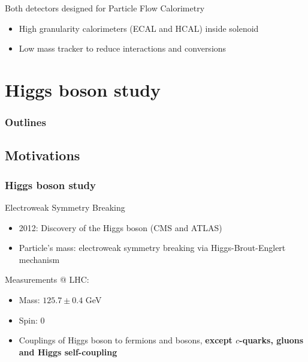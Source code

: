 \documentclass{beamer}
\begin{document}
\begin{frame}
  \vspace{-0.2cm}
  \begin{block}{Both detectors designed for Particle Flow Calorimetry}
    \footnotesize{
    \begin{itemize}
      \item High granularity calorimeters (ECAL and HCAL) inside solenoid
        \vspace{-0.1cm}
      \item Low mass tracker to reduce interactions and conversions
    \end{itemize}
    }
  \end{block}
  
\end{frame}
  
\section{Higgs boson study}
  \begin{frame}
    \frametitle{Outlines}
    \tableofcontents[currentsection,hideothersubsections, 
    sectionstyle=show/shaded,]
  \end{frame}

  \subsection{Motivations}

    \begin{frame}
      \frametitle{Higgs boson study}

      \begin{block}{Electroweak Symmetry Breaking}
        \begin{itemize}
          \item 2012: Discovery of the Higgs boson (CMS and ATLAS)
        \end{itemize}

      \end{block}

      \begin{itemize}
        \item Particle's mass: electroweak symmetry breaking via Higgs-Brout-Englert mechanism
      \end{itemize}
      \begin{block}{Measurements @ LHC:}
        \begin{itemize}
          \item Mass: $125.7 \pm 0.4$ GeV
          \item Spin: 0
          \item Couplings of Higgs boson to fermions and bosons, \textbf{except $c$-quarks, gluons and Higgs self-coupling}
        \end{itemize}
      \end{block}
    \end{frame}
\end{document}
